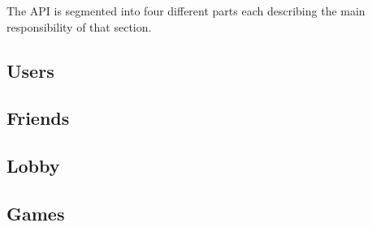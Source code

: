 The API\cite{ref_api} is segmented into four different parts each describing the main responsibility of that section.

\subsection{Users}


\subsection{Friends}


\subsection{Lobby}


\subsection{Games}
